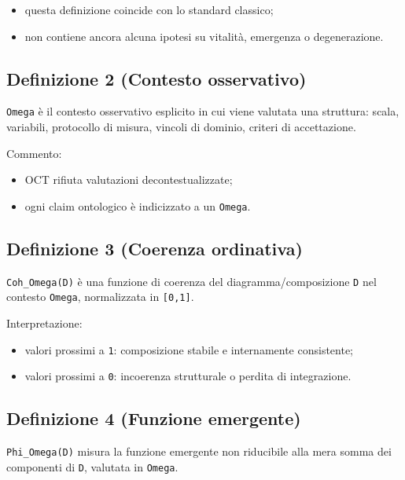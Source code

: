 \begin{itemize}
\tightlist
\item
  questa definizione coincide con lo standard classico;
\item
  non contiene ancora alcuna ipotesi su vitalità, emergenza o degenerazione.
\end{itemize}

\subsection{Definizione 2 (Contesto osservativo)}

\texttt{Omega} è il contesto osservativo esplicito in cui viene valutata una struttura: scala, variabili, protocollo di misura, vincoli di dominio, criteri di accettazione.

Commento:

\begin{itemize}
\tightlist
\item
  OCT rifiuta valutazioni decontestualizzate;
\item
  ogni claim ontologico è indicizzato a un \texttt{Omega}.
\end{itemize}

\subsection{Definizione 3 (Coerenza ordinativa)}

\texttt{Coh\_Omega(D)} è una funzione di coerenza del diagramma/composizione \texttt{D} nel contesto \texttt{Omega}, normalizzata in \texttt{{[}0,1{]}}.

Interpretazione:

\begin{itemize}
\tightlist
\item
  valori prossimi a \texttt{1}: composizione stabile e internamente consistente;
\item
  valori prossimi a \texttt{0}: incoerenza strutturale o perdita di integrazione.
\end{itemize}

\subsection{Definizione 4 (Funzione emergente)}

\texttt{Phi\_Omega(D)} misura la funzione emergente non riducibile alla mera somma dei componenti di \texttt{D}, valutata in \texttt{Omega}.

